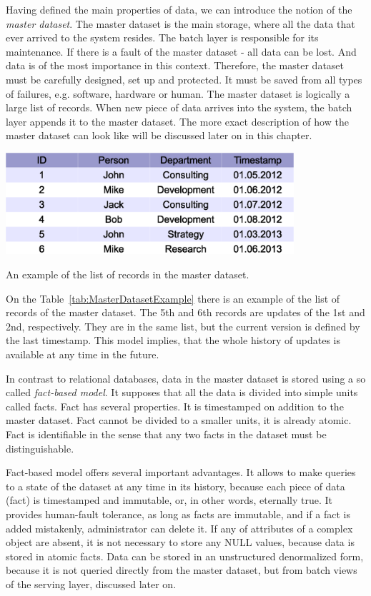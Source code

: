 Having defined the main properties of data, we can introduce the notion of the \textit{master dataset}.
The master dataset is the main storage, where all the data that ever arrived to the system resides.
The batch layer is responsible for its maintenance.
If there is a fault of the master dataset - all data can be lost.
And data is of the most importance in this context.
Therefore, the master dataset must be carefully designed, set up and protected.
It must be saved from all types of failures, e.g. software, hardware or human.
The master dataset is logically a large list of records.
When new piece of data arrives into the system, the batch layer appends it to the master dataset.
The more exact description of how the master dataset can look like will be discussed later on in this chapter.

\begin{table}[h]
  \centering
  \includegraphics [width=0.8\textwidth]{images/MasterDatasetExample}
  \caption{An example of the list of records in the master dataset.}
  \label{tab:MasterDatasetExample}
\end{table}

On the Table~\ref{tab:MasterDatasetExample} there is an example of the list of records of the master dataset.
The 5th and 6th records are updates of the 1st and 2nd, respectively.
They are in the same list, but the current version is defined by the last timestamp.
This model implies, that the whole history of updates is available at any time in the future. 

In contrast to relational databases, data in the master dataset is stored using a so called \textit{fact-based model}.
It supposes that all the data is divided into simple units called facts.
Fact has several properties.
It is timestamped on addition to the master dataset.
Fact cannot be divided to a smaller units, it is already atomic.
Fact is identifiable in the sense that any two facts in the dataset must be distinguishable.

Fact-based model offers several important advantages.
It allows to make queries to a state of the dataset at any time in its history, because each piece of data (fact) is timestamped and immutable, or, in other words, eternally true.
It provides human-fault tolerance, as long as facts are immutable, and if a fact is added mistakenly, administrator can delete it.
If any of attributes of a complex object are absent, it is not necessary to store any NULL values, because data is stored in atomic facts.
Data can be stored in an unstructured denormalized form, because it is not queried directly from the master dataset, but from batch views of the serving layer, discussed later on.

